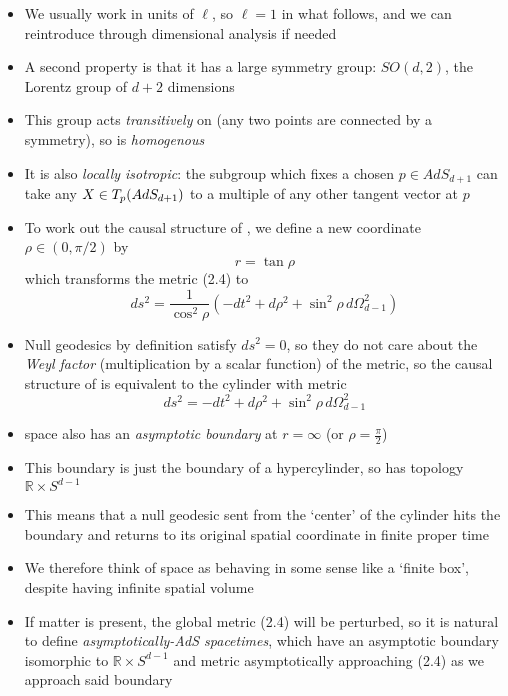\documentclass[12pt,a4paper]{article}
\numberwithin{equation}{section}
\begin{document}
\begin{itemize}
\begin{equation}
		\end{equation}
		\item We usually work in units of $\ell$, so $\ell=1$ in what follows, and we can reintroduce through dimensional analysis if needed
		\item A second property is that it has a large symmetry group: $SO(d,2)$, the Lorentz group of $d+2$ dimensions
		\item This group acts \textit{transitively} on \ads (any two points are connected by a symmetry), so \ads is \textit{homogenous}
		\item It is also \textit{locally isotropic}: the subgroup which fixes a chosen $p\in AdS_{d+1}$ can take any $X\in T_{p}(AdS_{d+1})$ to a multiple of any other tangent vector at $p$
		\item To work out the causal structure of \ads, we define a new coordinate $\rho\in (0,\pi/2)$ by
		\begin{equation}
			r=\tan{\rho}
		\end{equation}
		which transforms the metric (2.4) to
		\begin{equation}
			ds^{2}=\frac{1}{\cos^{2}\rho}(-dt^{2}+d\rho^{2}+\sin^{2}\rho\,d\Omega_{d-1}^{2})
		\end{equation}
		\item Null geodesics by definition satisfy $ds^{2}=0$, so they do not care about the \textit{Weyl factor} (multiplication by a scalar function) of the metric, so the causal structure of \ads is equivalent to the cylinder with metric
		\begin{equation}
			ds^{2}=-dt^{2}+d\rho^{2}+\sin^{2}\rho\,d\Omega_{d-1}^{2}
		\end{equation}
		\item \ads space also has an \textit{asymptotic boundary} at $r=\infty$ (or $\rho=\frac{\pi}{2}$)
		\item This boundary is just the boundary of a hypercylinder, so has topology $\mathbb{R}\times S^{d-1}$
		\item This means that a null geodesic sent from the `center' of the cylinder hits the boundary and returns to its original spatial coordinate in finite proper time
		\item We therefore think of \ads space as behaving in some sense like a `finite box', despite having infinite spatial volume
		\item If matter is present, the global metric (2.4) will be perturbed, so it is natural to define \textit{asymptotically-AdS spacetimes}, which have an asymptotic boundary isomorphic to $\mathbb{R}\times S^{d-1}$ and metric asymptotically approaching (2.4) as we approach said boundary

\end{itemize}
\end{document}
